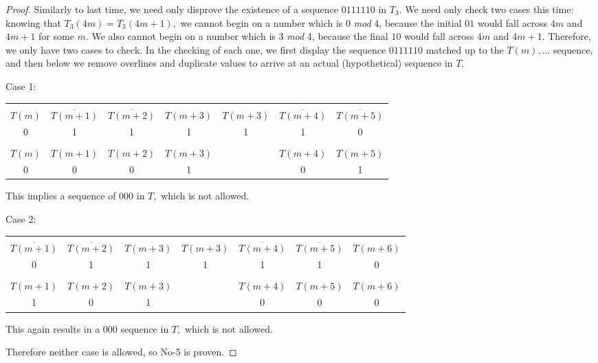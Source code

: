 \documentclass{article}
\begin{document}
\begin{proof}
Similarly to last time, we need only disprove the existence of a sequence $0111110$ in $T_3.$ We need only check two cases this time: knowing that $T_3(4m) = T_3(4m + 1),$ we cannot begin on a number which is 0 \emph{mod} 4, because the initial $01$ would fall across $4m$ and $4m+1$ for some $m.$ We also cannot begin on a number which is 3 \emph{mod} 4, because the final $10$ would fall across $4m$ and $4m+1.$ Therefore, we only have two cases to check. In the checking of each one, we first display the sequence $0111110$ matched up to the $T(m), ...$ sequence, and then below we remove overlines and duplicate values to arrive at an actual (hypothetical) sequence in $T.$

Case 1:

\begin{center}
\begin{tabular}{ |c|c|c|c|c|c|c| } 
 \hline
 &&&&&&\\
$T(m)$ & $\overline{T(m+1)}$ & $\overline{T(m+2)}$ & $T(m+3)$ & $T(m+3)$ & $\overline{T(m+4)}$ & $\overline{T(m+5)}$ \\ 
0 & 1 & 1 & 1 & 1 & 1 & 0 \\
\hline
&&&&&&\\
$T(m)$ & $T(m+1)$ & $T(m+2)$ & $T(m+3)$ & & $T(m+4)$ & $T(m+5)$ \\
0 & 0 & 0 & 1 & & 0 & 1 \\
 \hline
\end{tabular}
\end{center}

This implies a sequence of $000$ in $T,$ which is not allowed.

Case 2:

\begin{center}
\begin{tabular}{ |c|c|c|c|c|c|c| } 
 \hline
 &&&&&&\\
$\overline{T(m+1)}$ & $\overline{T(m+2)}$ & $T(m+3)$ & $T(m+3)$ & $\overline{T(m+4)}$ & $\overline{T(m+5)}$ & $T(m+6)$\\ 
0 & 1 & 1 & 1 & 1 & 1 & 0 \\
\hline
&&&&&&\\
$T(m+1)$ & $T(m+2)$ & $T(m+3)$ & & $T(m+4)$ & $T(m+5)$ & $T(m+6)$ \\
 1 & 0 & 1 & & 0 & 0 & 0 \\
 \hline
\end{tabular}
\end{center}

This again results in a $000$ sequence in $T,$ which is not allowed.

Therefore neither case is allowed, so No-5 is proven.
\end{proof}
\end{document}
